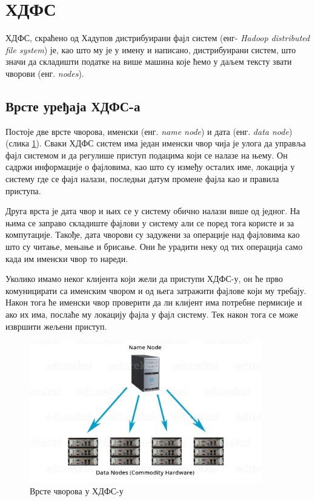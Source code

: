 \documentclass[12pt,oneside]{memoir}
\begin{document}
\section{ХДФС}
\label{sec:hdfs}

ХДФС, скраћено од Хадупов дистрибуирани фајл систем (енг- \textit{Hadoop distributed file system}) је, као што му је у имену и написано, дистрибуирани систем, што значи да складишти податке на више машина које ћемо у даљем тексту звати чворови (енг. \textit{nodes}). 

\subsection{Врсте уређаја ХДФС-а}
\label{subsec:hdfs_nodes}

Постоје две врсте чворова, именски (енг. \textit{name node}) и дата (енг. \textit{data node}) (слика \ref{fig:hadoop_nodovi}). Сваки ХДФС систем има један именски чвор чија је улога да управља фајл системом и да регулише приступ подацима који се налазе на њему. Он садржи информације о фајловима, као што су између осталих име, локација у систему где се фајл налази, последњи датум промене фајла као и правила приступа. \cite{hadoop_arch_guide}

Друга врста је дата чвор и њих се у систему обично налази више од једног. На њима се заправо складиште фајлови у систему али се поред тога користе и за компутације. Такође, дата чворови су задужени за операције над фајловима као што су читање, мењање и брисање. Они ће урадити неку од тих операција само када им именски чвор то нареди. \cite{hadoop_arch_guide}

Уколико имамо неког клијента који жели да приступи ХДФС-у, он ће прво комуницирати са именским чвором и од њега затражити фајлове који му требају. Након тога ће именски чвор проверити да ли клијент има потребне пермисије и ако их има, послаће му локацију фајла у фајл систему. Тек након тога се може извршити жељени приступ. 

\begin{figure}[!ht]
  \centering
  \includegraphics[width=0.9\textwidth]{pictures/hdfs_nodovi.png}
  \caption{Врсте чворова у ХДФС-у}
  \label{fig:hadoop_nodovi}
\end{figure}
\end{document}
